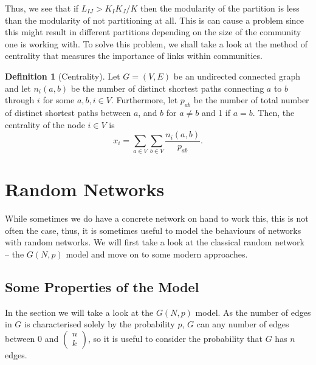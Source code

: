 \documentclass[
]{article}
\theoremstyle{definition}
\theoremstyle{definition}
\newtheorem{definition}{Definition}[section]
\begin{document}
Thus, we see that if \(L_{IJ} > K_I K_J / K\) then the modularity of the
partition is less than the modularity of not partitioning at all. This
is can cause a problem since this might result in different partitions
depending on the size of the community one is working with. To solve
this problem, we shall take a look at the method of centrality that
measures the importance of links within communities.

\begin{definition}[Centrality]
  Let \(G = (V, E)\) be an undirected connected graph and let \(n_i(a, b)\) be the 
  number of distinct shortest paths connecting \(a\) to \(b\) through \(i\) for 
  some \(a, b, i \in V\). Furthermore, let \(p_{ab}\) be the number of total 
  number of distinct shortest paths between \(a\), and \(b\) for \(a \neq b\) 
  and 1 if \(a = b\). Then, the centrality of the node \(i \in V\) is 
  \[x_i = \sum_{a \in V} \sum_{b \in V} \frac{n_i(a, b)}{p_{ab}}.\]
 \end{definition}

\newpage

\hypertarget{random-networks}{%
\section{Random Networks}\label{random-networks}}

While sometimes we do have a concrete network on hand to work this, this
is not often the case, thus, it is sometimes useful to model the
behaviours of networks with random networks. We will first take a look
at the classical random network -- the \(G(N, p)\) model and move on to
some modern approaches.

\hypertarget{some-properties-of-the-model}{%
\subsection{Some Properties of the
Model}\label{some-properties-of-the-model}}

In the section we will take a look at the \(G(N, p)\) model. As the
number of edges in \(G\) is characterised solely by the probability
\(p\), \(G\) can any number of edges between 0 and
\(\begin{pmatrix} n \\ k \end{pmatrix}\), so it is useful to consider
the probability that \(G\) has \(n\) edges.
\end{document}
